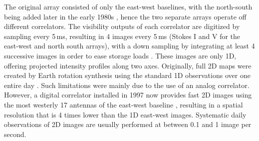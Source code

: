 The original array consisted of only the east-west baselines, with the north-south being added later in the early 1980s \citep{bonmartin1983}, hence the two separate arrays operate off different correlators. The visibility outputs of each correlator are digitized by sampling every 5\,ms, resulting in 4 images every 5\,ms (Stokes I and V for the east-west and north south arrays), with a down sampling  by integrating at least 4 successive images in order to ease storage loads \citep{avignon1989}. These images are only 1D, offering projected intensity profiles along two axes. Originally, full 2D maps were created by Earth rotation synthesis using the standard 1D observations over one entire day \citep{nrh1993}. Such limitations were mainly due to the use of an analog correlator. However, a digital correlator installed in 1997 now provides fast 2D images using the most westerly 17 antennas of the east-west baseline \citep{kerdraon1997}, resulting in a spatial resolution that is 4 times lower than the 1D east-west images. Systematic daily observations of 2D images are usually performed at between 0.1 and 1 image per second.

